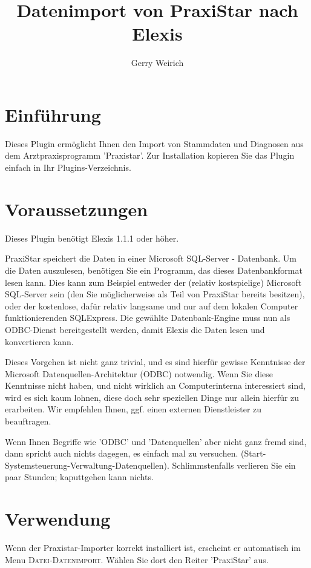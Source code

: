 \documentclass[a4paper]{scrartcl}
\title{Datenimport von PraxiStar nach Elexis\textsuperscript{\textregistered}}
\author{Gerry Weirich}
\begin{document}
\maketitle
\section{Einführung}

Dieses Plugin ermöglicht Ihnen den Import von Stammdaten und Diagnosen aus dem Arztpraxisprogramm 'Praxistar'.
Zur Installation kopieren Sie das Plugin einfach in Ihr Plugins-Verzeichnis.

\section{Voraussetzungen}
Dieses Plugin benötigt Elexis 1.1.1 oder höher.

\medskip

PraxiStar speichert die Daten in einer Microsoft\texttrademark{} SQL-Server - Datenbank. Um die Daten auszulesen, benötigen Sie ein Programm, das dieses Datenbankformat lesen kann. Dies kann zum Beispiel entweder der (relativ kostspielige) Microsoft\texttrademark{} SQL-Server sein (den Sie möglicherweise als Teil von PraxiStar bereits besitzen), oder der kostenlose, dafür relativ langsame und nur auf dem lokalen Computer funktionierenden SQLExpress. Die gewählte Datenbank-Engine muss nun als ODBC-Dienst bereitgestellt werden, damit Elexis die Daten lesen und konvertieren kann.

Dieses Vorgehen ist nicht ganz trivial, und es sind hierfür gewisse Kenntnisse der Microsoft Datenquellen-Architektur (ODBC) notwendig. Wenn Sie diese Kenntnisse nicht haben, und nicht wirklich an Computerinterna interessiert sind, wird es sich kaum lohnen, diese doch sehr speziellen Dinge nur allein hierfür zu erarbeiten. Wir empfehlen Ihnen, ggf. einen externen Dienstleister zu beauftragen.

\medskip

Wenn Ihnen Begriffe wie 'ODBC' und 'Datenquellen' aber nicht ganz fremd sind, dann spricht auch nichts dagegen, es einfach mal zu versuchen. (Start-Systemsteuerung-Verwaltung-Datenquellen). Schlimmstenfalls verlieren Sie ein paar Stunden; kaputtgehen kann nichts.

\section{Verwendung}
Wenn der Praxistar-Importer korrekt installiert ist, erscheint er automatisch im Menu \textsc{Datei-Datenimport}. Wählen Sie dort den Reiter 'PraxiStar' aus.
\end{document}
